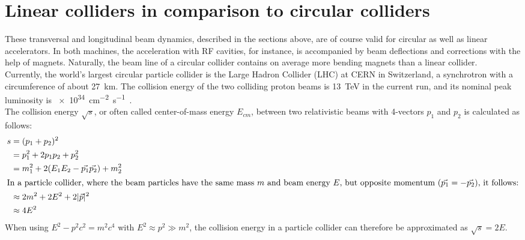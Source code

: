 \section{Linear colliders in comparison to circular colliders}
\label{AccPhysics:Linear-Circular}
These transversal and longitudinal beam dynamics, described in the sections above, are of course valid for circular as well as linear accelerators.
In both machines, the acceleration with RF cavities, for instance, is accompanied by beam deflections and corrections with the help of magnets.
Naturally, the beam line of a circular collider contains on average more bending magnets than a linear collider.\\
Currently, the world's largest circular particle collider is the Large Hadron Collider (LHC) at CERN in Switzerland, a synchrotron with a circumference of about \SI{27}{\kilo\meter}.
The collision energy of the two colliding proton beams is \SI{13}{\TeV} in the current run, and its nominal peak luminosity \lumi is \SI{e34}{\centi\meter^{-2}\second^{-1}}~\cite[p. 3]{LHC_Paper}.\\
The collision energy $\sqrt{s}$, or often called center-of-mass energy $E_{cm}$, between two relativistic beams with 4-vectors $p_1$ and $p_2$ is calculated as follows:
\begin{align*}
 s &= (p_1+p_2)^2\\
 &=p_1^2+2p_1p_2+p_2^2\\
 &=m_1^2+2(E_1E_2-\vec{p_1}\vec{p_2})+m_2^2\\
\intertext{In a particle collider, where the beam particles have the same mass $m$ and beam energy $E$, but opposite momentum ($\vec{p_1}=-\vec{p_2}$), it follows:}
&\approx2m^2+2E^2+2|\vec{p}|^2\\
&\approx4E^2
\end{align*}
When using $E^2-p^2c^2=m^2c^4$ with $E^2\approx p^2 \gg m^2$, the collision energy in a particle collider can therefore be approximated as $\sqrt{s}=2E$.


